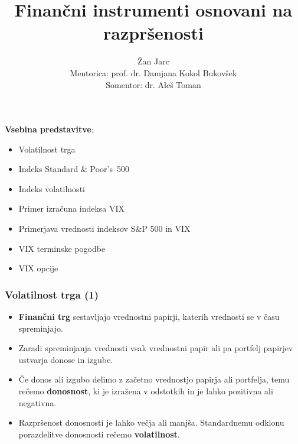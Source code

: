 \documentclass[10pt]{beamer}
\begin{document}
\title[Finančni instrumenti osnovani na razpršenosti]{Finančni instrumenti osnovani na razpršenosti}
\author[Žan Jarc]{Žan Jarc \\[0.5cm] \footnotesize Mentorica: prof. dr. Damjana Kokol Bukovšek \\[0.3cm] Somentor: dr. Aleš Toman}


\begin{frame}
	\titlepage
\end {frame}

\begin{frame}
\textbf{Vsebina predstavitve}:
	\begin{itemize}
		\item Volatilnost trga
		\item Indeks Standard \& Poor’s~500
		\item Indeks volatilnosti
		\item Primer izračuna indeksa VIX
		\item Primerjava vrednosti indeksov S\&P 500 in VIX
		\item VIX terminske pogodbe
		\item VIX opcije
	\end{itemize}
\end {frame}

\begin{frame}
\frametitle{Volatilnost trga (1)}
\begin{itemize}
\item \textbf{Finančni trg} sestavljajo vrednostni papirji, katerih vrednosti se v času spreminjajo.
\item Zaradi spreminjanja vrednosti vsak vrednostni papir ali pa portfelj papirjev ustvarja donose in izgube.
\item Če donos ali izgubo delimo z začetno vrednostjo papirja ali portfelja, temu rečemo \textbf{donosnost}, ki je izražena v odstotkih in je lahko pozitivna ali negativna.
\item  Razpršenost donosnosti je lahko večja ali manjša. Standardnemu odklonu porazdelitve donosnosti rečemo \textbf{volatilnost}.

\end{itemize}
\end{frame}
\end{document}
